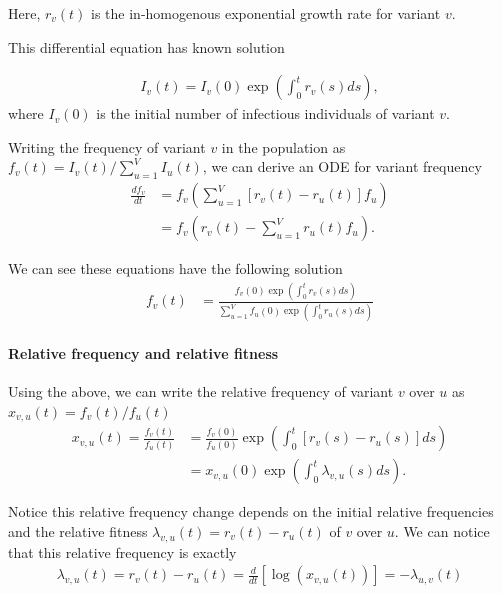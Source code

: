\documentclass[12pt,oneside,letterpaper]{article}
\begin{document}
Here, $r_{v}(t)$ is the in-homogenous exponential growth rate for variant $v$.

This differential equation has known solution

\begin{align*}
I_{v}(t) = I_{v}(0) \exp\left( \int_{0}^{t} r_{v}(s) ds\right),
\end{align*}
where $I_{v}(0)$ is the initial number of infectious individuals of variant $v$. 

Writing the frequency of variant $v$ in the population as  $f_{v}(t) = I_{v}(t) / \sum_{u=1}^{V} I_{u}(t)$, we can derive an ODE for variant frequency
\begin{align*}
    \frac{d f_{v}}{d t} &= f_{v} \left( \sum_{u=1}^{V} [r_{v}(t) - r_{u}(t)] f_{u} \right)\\
                        &= f_{v} \left( r_{v}(t) - \sum_{u=1}^{V} r_{u}(t) f_{u} \right).
\end{align*}

We can see these equations have the following solution
\begin{align}
    f_{v}(t) &= \frac{ f_{v}(0) \exp( \int_{0}^{t} r_{v}(s) ds)}{\sum_{u=1}^{V}  f_{u}(0) \exp( \int_{0}^{t} r_{u}(s) ds)}
\end{align}


\paragraph{Relative frequency and relative fitness}%

Using the above, we can write the relative frequency of variant $v$ over $u$ as $x_{v,u}(t) = f_{v}(t) / f_{u}(t)$
\begin{align*}
    x_{v, u}(t) = \frac{f_{v}(t)}{f_{u}(t)} &= \frac{f_{v}(0)}{f_{u}(0)} \exp \left( \int_{0}^{t} [r_{v}(s) - r_{u}(s)] ds \right)\\
                                            &=x_{v,u}(0)\exp \left( \int_{0}^{t} \lambda_{v,u}(s) ds \right).
\end{align*}

Notice this relative frequency change depends on the initial relative frequencies and the relative fitness $\lambda_{v,u}(t) = r_{v}(t) - r_{u}(t)$ of $v$ over $u$.
We can notice that this relative frequency is exactly
\begin{align}
\lambda_{v, u}(t) = r_{v}(t) - r_{u}(t) = \frac{d }{d t} \left[\log \left( x_{v,u}(t) \right) \right] = - \lambda_{u,v}(t)
\end{align}
\end{document}

